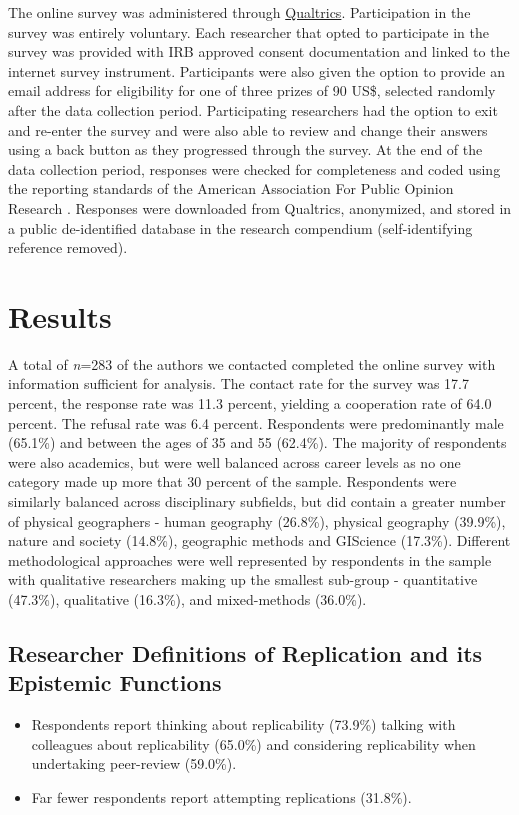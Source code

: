 \documentclass[]{interact}
\theoremstyle{plain}%
\theoremstyle{definition}
\theoremstyle{remark}
\begin{document}
The online survey was administered through \href{https://www.qualtrics.com/}{Qualtrics}. 
Participation in the survey was entirely voluntary. 
Each researcher that opted to participate in the survey was provided with IRB approved consent documentation and linked to the internet survey instrument. 
Participants were also given the option to provide an email address for eligibility for one of three  prizes of 90 US\$, selected randomly after the data collection period.
Participating researchers had the option to exit and re-enter the survey and were also able to review and change their answers using a back button as they progressed through the survey.
At the end of the data collection period, responses were checked for completeness and coded using the reporting standards of the American Association For Public Opinion Research \citep{aaporstandards}.
Responses were downloaded from Qualtrics, anonymized, and stored in a public de-identified database in the research compendium (self-identifying reference removed).


\section*{Results}
A total of \textit{n}=283 of the authors we contacted completed the online survey with information sufficient for analysis. 
The contact rate for the survey was 17.7 percent, the response rate was 11.3 percent, yielding a cooperation rate of 64.0 percent. 
The refusal rate was 6.4 percent.
Respondents were predominantly male (65.1\%) and between the ages of 35 and 55 (62.4\%). 
The majority of respondents were also academics, but were well balanced across career levels as no one category made up more that 30 percent of the sample.
Respondents were similarly balanced across disciplinary subfields, but did contain a greater number of physical geographers  - human geography (26.8\%), physical geography (39.9\%), nature and society (14.8\%), geographic methods and GIScience (17.3\%). 
Different methodological approaches were well represented by respondents in the sample with qualitative researchers making up the smallest sub-group  - quantitative (47.3\%), qualitative (16.3\%), and mixed-methods (36.0\%).

\subsection*{Researcher Definitions of Replication and its Epistemic Functions}
\begin{itemize}
    \item Respondents report thinking about replicability (73.9\%) talking with colleagues about replicability (65.0\%) and considering replicability when undertaking peer-review (59.0\%). 
    \item Far fewer respondents report attempting replications (31.8\%). 
\end{itemize}
\end{document}

